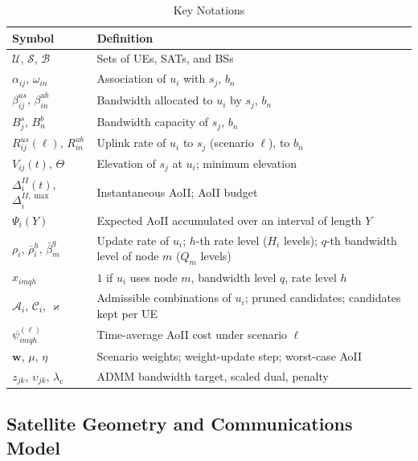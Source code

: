 \begin{table}[!t]
\centering
\caption{Key Notations}
\label{tab:notation}
\scriptsize
\renewcommand{\arraystretch}{1.15}
\begin{tabular}{|p{}|p{}|}
\hline
\textbf{Symbol} & \textbf{Definition} \\
\hline
$\mathscr{U}$, $\mathscr{S}$, $\mathscr{B}$ & Sets of UEs, SATs, and BSs \\
\hline
$\alpha_{ij}$, $\omega_{in}$ & Association of $u_i$ with $s_j$, $b_n$ \\
\hline
$\beta^{us}_{ij}$, $\beta^{ub}_{in}$ & Bandwidth allocated to $u_i$ by $s_j$, $b_n$ \\
\hline
$B^{s}_{j}$, $B^{b}_{n}$ & Bandwidth capacity of $s_j$, $b_n$ \\
\hline
$R^{us}_{ij}(\ell)$, $R^{ub}_{in}$ & Uplink rate of $u_i$ to $s_j$ (scenario $\ell$), to $b_n$ \\
\hline
$V_{ij}(t)$, $\Theta$ & Elevation of $s_j$ at $u_i$; minimum elevation \\
\hline
$\Delta_i^{II}(t)$, $\Delta_i^{II,\max}$ & Instantaneous AoII; AoII budget \\
\hline
$\Psi_i(Y)$ & Expected AoII accumulated over an interval of length $Y$ \\
\hline
$\rho_i$, $\bar\rho_i^{h}$, $\bar\beta_m^{q}$ & Update rate of $u_i$; $h$-th rate level ($H_i$ levels); $q$-th bandwidth level of node $m$ ($Q_m$ levels) \\
\hline
$x_{imqh}$ & $1$ if $u_i$ uses node $m$, bandwidth level $q$, rate level $h$ \\
\hline
$\mathscr{A}_i$, $\mathscr{C}_i$, $\varkappa$ & Admissible combinations of $u_i$; pruned candidates; candidates kept per UE \\
\hline
$\psi^{(\ell)}_{imqh}$ & Time-average AoII cost under scenario $\ell$ \\
\hline
$\mathbf{w}$, $\mu$, $\eta$ & Scenario weights; weight-update step; worst-case AoII \\
\hline
$z_{jk}$, $\upsilon_{jk}$, $\lambda_{\mathrm{c}}$ & ADMM bandwidth target, scaled dual, penalty \\
\hline
\end{tabular}
\end{table}

\subsection{Satellite Geometry and Communications Model}
\label{sec:geometry}

